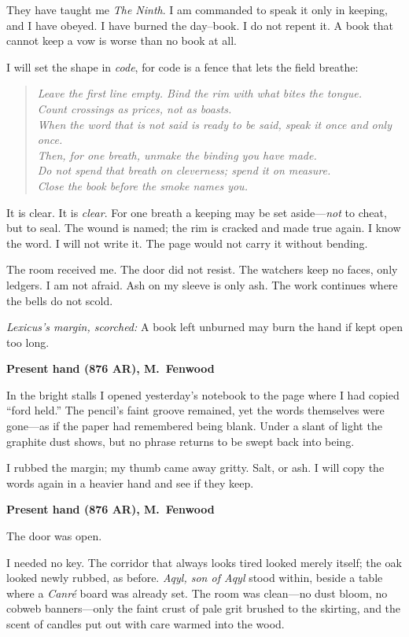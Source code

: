 \documentclass[11pt]{article}
\begin{document}
They have taught me \emph{The Ninth}. I am commanded to speak it only in keeping, and I have obeyed. I have burned the day–book. I do not repent it. A book that cannot keep a vow is worse than no book at all.

I will set the shape in \emph{code}, for code is a fence that lets the field breathe:

\begin{quote}\small
\textit{Leave the first line empty. Bind the rim with what bites the tongue.\\
Count crossings as prices, not as boasts.\\
When the word that is not said is ready to be said, speak it once and only once.\\
Then, for one breath, unmake the binding you have made.\\
Do not spend that breath on cleverness; spend it on measure.\\
Close the book before the smoke names you.}
\end{quote}

It is clear. It is \emph{clear}. For one breath a keeping may be set aside—\emph{not} to cheat, but to seal. The wound is named; the rim is cracked and made true again. I know the word. I will not write it. The page would not carry it without bending.

The room received me. The door did not resist. The watchers keep no faces, only ledgers. I am not afraid. Ash on my sleeve is only ash. The work continues where the bells do not scold.

\medskip
\noindent\textit{Lexicus’s margin, scorched:} A book left unburned may burn the hand if kept open too long.

\medskip
\noindent\textbf{Present hand (876 AR), M.\ Fenwood}

In the bright stalls I opened yesterday’s notebook to the page where I had copied “ford held.” The pencil’s faint groove remained, yet the words themselves were gone—as if the paper had remembered being blank. Under a slant of light the graphite dust shows, but no phrase returns to be swept back into being.

I rubbed the margin; my thumb came away gritty. Salt, or ash. I will copy the words again in a heavier hand and see if they keep.

\medskip
\noindent\textbf{Present hand (876 AR), M.\ Fenwood}

The door was open.

I needed no key. The corridor that always looks tired looked merely itself; the oak looked newly rubbed, as before. \textit{Aqyl, son of Aqyl} stood within, beside a table where a \emph{Canr\'e} board was already set. The room was clean—no dust bloom, no cobweb banners—only the faint crust of pale grit brushed to the skirting, and the scent of candles put out with care warmed into the wood.
\end{document}

